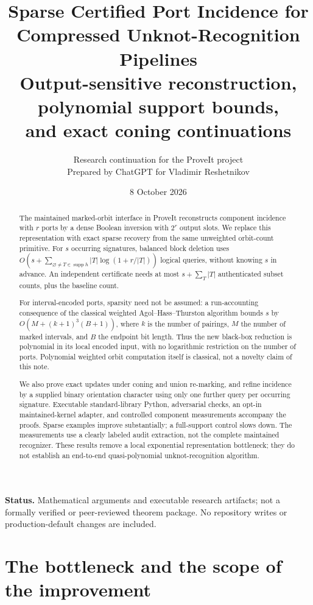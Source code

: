\documentclass[11pt]{article}
\title{\textbf{Sparse Certified Port Incidence for\protect\\
Compressed Unknot-Recognition Pipelines}\\[6pt]
\large Output-sensitive reconstruction, polynomial support bounds,\protect\\
and exact coning continuations}
\author{Research continuation for the ProveIt project\\
\small Prepared by ChatGPT for Vladimir Reshetnikov}
\date{8 October 2026}
\theoremstyle{definition}
\newcommand{\supp}{\operatorname{supp}}
\begin{document}
\maketitle
\begin{abstract}
The maintained marked-orbit interface in ProveIt reconstructs component
incidence with $r$ ports by a dense Boolean inversion with $2^r$ output slots.
We replace this representation with exact sparse recovery from the same
unweighted orbit-count primitive. For $s$ occurring signatures, balanced
block deletion uses
$O(s+\sum_{\varnothing\neq T\in\supp h}|T|\log(1+r/|T|))$ logical queries, without
knowing $s$ in advance. An independent certificate needs at most
$s+\sum_T|T|$ authenticated subset counts, plus the baseline count.

For interval-encoded ports, sparsity need not be assumed: a run-accounting
consequence of the classical weighted Agol--Hass--Thurston algorithm bounds
$s$ by $O(M+(k+1)^3(B+1))$, where $k$ is the number of pairings, $M$ the
number of marked intervals, and $B$ the endpoint bit length. Thus the new
black-box reduction is polynomial in its local encoded input, with no
logarithmic restriction on the number of ports. Polynomial weighted orbit
computation itself is classical, not a novelty claim of this note.

We also prove exact updates under coning and union re-marking, and refine
incidence by a supplied binary orientation character using only one further
query per occurring signature. Executable standard-library Python, adversarial
checks, an opt-in maintained-kernel adapter, and controlled component
measurements accompany the proofs. Sparse examples improve substantially;
a full-support control slows down. The measurements use a clearly labeled
audit extraction, not the complete maintained recognizer. These results
remove a local exponential representation bottleneck; they do not establish
an end-to-end quasi-polynomial unknot-recognition algorithm.
\end{abstract}
\vspace{4pt}
\noindent\textbf{Status.} Mathematical arguments and executable research artifacts;
not a formally verified or peer-reviewed theorem package. No repository writes
or production-default changes are included.
\newpage
\setcounter{tocdepth}{1}
\tableofcontents
\newpage

\section{The bottleneck and the scope of the improvement}
\label{sec:scope}
\end{document}
